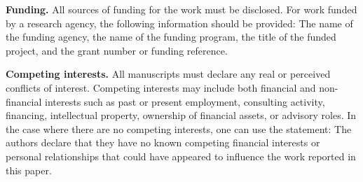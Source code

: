\documentclass[article,preview]{planetary}
\begin{document}
\noindent\textbf{Funding.} All sources of funding for the work must be disclosed. For work funded by a research agency, the following information should be provided: The name of the funding agency, the name of the funding program, the title of the funded project, and the grant number or funding reference.

\noindent\textbf{Competing interests.} All manuscripts must declare any real or perceived conflicts of interest. Competing interests may include both financial and non-financial interests such as past or present employment, consulting activity, financing, intellectual property, ownership of financial assets, or advisory roles. In the case where there are no competing interests, one can use the statement: The authors declare that they have no known competing financial interests or personal relationships that could have appeared to influence the work reported in this paper.


\printbibliography

\end{document}
